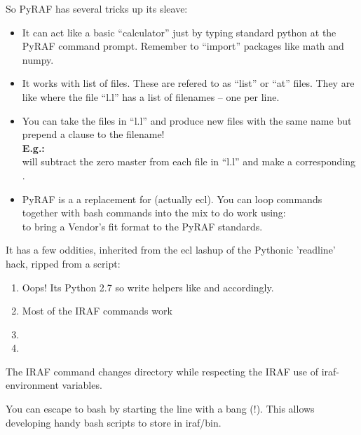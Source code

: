 \documentclass[letter,11pt,oneside]{article}
\newcommand{\dhl}[1]{{\color{verbcolor}{\texttt#1}}}
\begin{document}
So PyRAF has several tricks up its sleave:
\begin{itemize}
\addtolength{\itemsep}{-0.5\baselineskip}
   \item   It can act like a basic ``calculator'' just by typing standard python at the
PyRAF command prompt. Remember to ``import'' packages like math and numpy.
   \item It works with list of files. These are refered to as ``list''
     or ``at'' files. They are like {\color{verbcolor}{\verb#@l.l#}}
     where the file ``l.l'' has a list of filenames -- one per line.
   \item You can take the files in ``l.l'' and produce new files with
     the same name but prepend a clause to the
     filename!\\ \textbf{E.g.:}
     {\color{verbcolor}{\verb#imarith @l.l - zmaster.fits z_//@l.l#}}\\ will
     subtract the zero master from each file in ``l.l'' and make a
     corresponding {\color{verbcolor}{\verb#z_filename.fits#}}.
\item PyRAF is a a replacement for {\color{verbcolor}{\verb#cl#}} (actually
ecl). You can loop {\color{verbcolor}{\verb#.cl#}} commands together
with bash commands into the mix to do work using:\\
{\color{verbcolor}{\verb#cl < ~/iraf/fit2fits.cl#}} to bring a Vendor's
fit format to the PyRAF standards.
\end{itemize}

It has a few oddities, inherited from the ecl lashup of the Pythonic 'readline' hack,
ripped from a \dhl{reduce.cl} script:

\vspace{-.15cm}
\begin{enumerate}\addtolength{\itemsep}{-0.5\baselineskip}
   \item Oops! Its Python 2.7 so write helpers like \dhl{trim} and
     \dhl{fitsls} accordingly.
   \item   Most of the IRAF \dhl{cl} commands work
   \item   \dhl{set OBSROOT=/home/me/Observations/23Feb2022}
   \item   \dhl{set OBS=OBSROOT\$/PreAnalysis}
\end{enumerate}

The IRAF command \dhl{chdir}  changes directory while respecting
the IRAF use of iraf-environment variables.

You can escape to bash by starting the line with a bang (!). This
allows developing handy bash scripts to store in iraf/bin.
\end{document}
